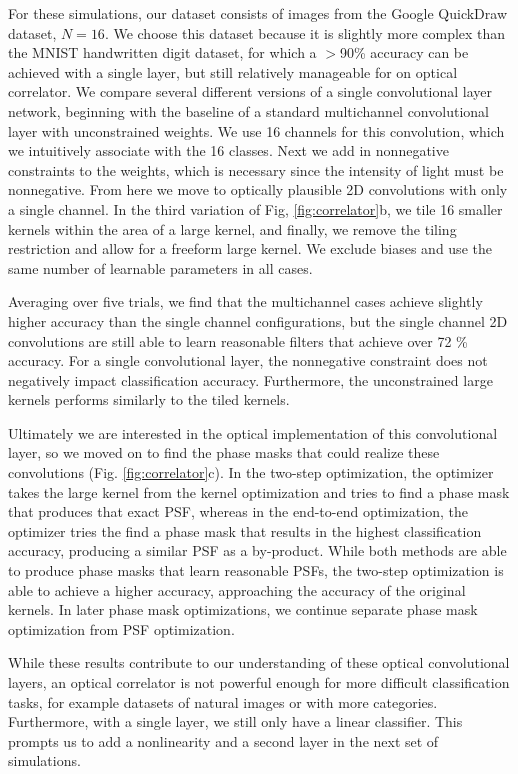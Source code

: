 \documentclass[fleqn,10pt]{wlscirep}
\begin{document}
For these simulations, our dataset consists of images from the Google QuickDraw dataset, $N = 16$. We choose this dataset because it is slightly more complex than the MNIST handwritten digit dataset, for which a $>$90\% accuracy can be achieved with a single layer, but still relatively manageable for on optical correlator. We compare several different versions of a single convolutional layer network, beginning with the baseline of a standard multichannel convolutional layer with unconstrained weights. We use 16 channels for this convolution, which we intuitively associate with the 16 classes. Next we add in nonnegative constraints to the weights, which is necessary since the intensity of light must be nonnegative. From here we move to optically plausible 2D convolutions with only a single channel. In the third variation of Fig, \ref{fig:correlator}b, we tile 16 smaller kernels within the area of a large kernel, and finally, we remove the tiling restriction and allow for a freeform large kernel. We exclude biases and use the same number of learnable parameters in all cases. 

Averaging over five trials, we find that the multichannel cases achieve slightly higher accuracy than the single channel configurations, but the single channel 2D convolutions are still able to learn reasonable filters that achieve over 72 \% accuracy.  For a single convolutional layer, the nonnegative constraint does not negatively impact classification accuracy. Furthermore, the unconstrained large kernels performs similarly to the tiled kernels. 

Ultimately we are interested in the optical implementation of this convolutional layer, so we moved on to find the phase masks that could realize these convolutions  (Fig. \ref{fig:correlator}c). In the two-step optimization, the optimizer takes the large kernel from the kernel optimization and tries to find a phase mask that produces that exact PSF, whereas in the end-to-end optimization, the optimizer tries the find a phase mask that results in the highest classification accuracy, producing a similar PSF as a by-product. While both methods are able to produce phase masks that learn reasonable PSFs, the two-step optimization is able to achieve a higher accuracy, approaching the accuracy of the original kernels. In later phase mask optimizations, we continue separate phase mask optimization from PSF optimization.

While these results contribute to our understanding of these optical convolutional layers, an optical correlator is not powerful enough for more difficult classification tasks, for example datasets of natural images or with more categories. Furthermore, with a single layer, we still only have a linear classifier. This prompts us to add a nonlinearity and a second layer in the next set of simulations.
\end{document}
